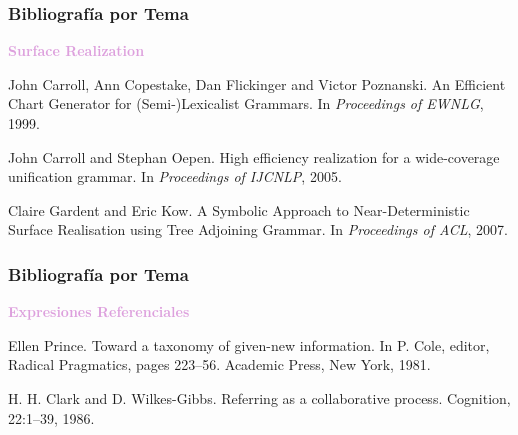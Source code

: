\documentclass[compress,color=usenames]{beamer}
\newcommand{\mH}[1]{\textcolor{Plum}{#1}}
\begin{document}
\begin{frame}
\frametitle{Bibliograf\'ia por Tema}

\mH{\bf Surface Realization}
\medskip

\begin{thebibliography}{10}\small

 John Carroll, Ann Copestake, Dan Flickinger and Victor Poznanski.
\newblock An Efficient Chart Generator for (Semi-)Lexicalist Grammars.
\newblock In \emph{Proceedings of EWNLG}, 1999.

 John Carroll and Stephan Oepen.
\newblock High efficiency realization for a wide-coverage unification grammar.
\newblock In \emph{Proceedings of IJCNLP}, 2005.


 Claire Gardent and Eric Kow.
\newblock A Symbolic Approach to Near-Deterministic Surface Realisation using
Tree Adjoining Grammar.
\newblock In \emph{Proceedings of ACL}, 2007.

\end{thebibliography}
\end{frame}



\begin{frame}
\frametitle{Bibliograf\'ia por Tema}

\mH{\bf Expresiones Referenciales}
\medskip

\begin{thebibliography}{10}\small

 Ellen Prince.
\newblock Toward a taxonomy of given-new information.
\newblock In P. Cole, editor, Radical Pragmatics, pages 223--56. Academic Press, New York, 1981.

 H. H. Clark and D. Wilkes-Gibbs. 
\newblock Referring as a collaborative process.
\newblock Cognition, 22:1--39, 1986.

\end{thebibliography}
\end{frame}
\end{document}
